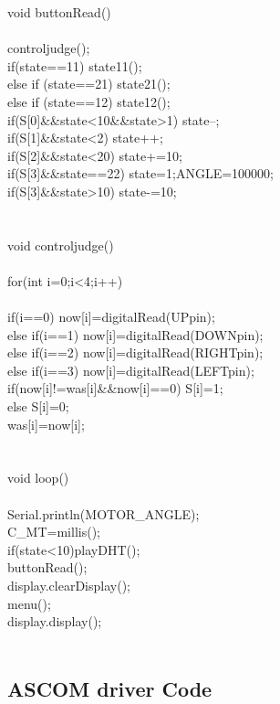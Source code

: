 void buttonRead()\\
{\\
	controljudge();\\
	if(state==11) state11(); \\
	else if (state==21) state21();\\
	else if (state==12) state12();\\
	if(S[0]\&\&state<10\&\&state>1) state--;\\
	if(S[1]\&\&state<2) state++;\\
	if(S[2]\&\&state<20) state+=10;\\
	if(S[3]\&\&state==22) {state=1;ANGLE=100000;}\\
	if(S[3]\&\&state>10) state-=10;\\
	\\
}\\
void controljudge()\\
{\\
	for(int i=0;i<4;i++)\\
	{\\
		if(i==0) now[i]=digitalRead(UPpin);\\
		else if(i==1) now[i]=digitalRead(DOWNpin);\\
		else if(i==2) now[i]=digitalRead(RIGHTpin);\\
		else if(i==3) now[i]=digitalRead(LEFTpin);\\
		if(now[i]!=was[i]\&\&now[i]==0) S[i]=1;\\
		else S[i]=0;\\
		was[i]=now[i];\\
	}\\
}\\
void loop()\\
{\\
	Serial.println(MOTOR\_ANGLE);\\
	C\_MT=millis();\\
	if(state<10)playDHT();\\
	buttonRead();\\
	display.clearDisplay();\\
	menu();\\
	display.display();\\
}\\



\subsection{ASCOM driver Code}